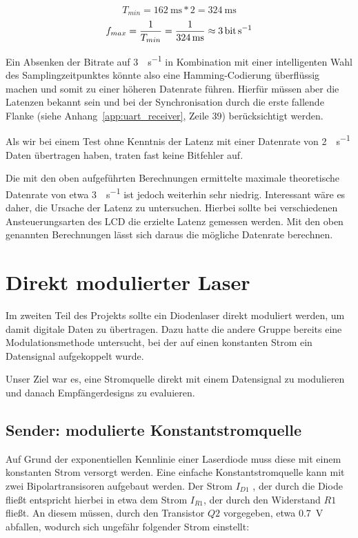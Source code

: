 \documentclass[12pt,a4paper]{article}
\begin{document}
\begin{equation}
	T_{min} = \SI{162}{\milli\second} * 2 = \SI{324}{\milli\second}
\end{equation}
\begin{equation}
	f_{max} = \frac{1}{T_{min}} = \frac{1}{\SI{324}{\milli\second}} \approx \SI{3}{\bit\per\second}
\end{equation}

Ein Absenken der Bitrate auf \SI{3}{\bit\per\second} in Kombination mit einer intelligenten Wahl des Samplingzeitpunktes könnte also eine Hamming-Codierung überflüssig machen und somit zu einer höheren Datenrate führen. Hierfür müssen aber die Latenzen bekannt sein und bei der Synchronisation durch die erste fallende Flanke (siehe Anhang~\ref{app:uart_receiver}, Zeile 39) berücksichtigt werden.

Als wir bei einem Test ohne Kenntnis der Latenz mit einer Datenrate von \SI{2}{\bit\per\second} Daten übertragen haben, traten fast keine Bitfehler auf.

Die mit den oben aufgeführten Berechnungen ermittelte maximale theoretische Datenrate von etwa \SI{3}{\bit\per\second} ist jedoch weiterhin sehr niedrig. Interessant wäre es daher, die Ursache der Latenz zu untersuchen. Hierbei sollte bei verschiedenen Ansteuerungsarten des LCD die erzielte Latenz gemessen werden. Mit den oben genannten Berechnungen lässt sich daraus die mögliche Datenrate berechnen.

\section{Direkt modulierter Laser}
Im zweiten Teil des Projekts sollte ein Diodenlaser direkt moduliert werden, um damit digitale Daten zu übertragen. Dazu hatte die andere Gruppe bereits eine Modulationsmethode untersucht, bei der auf einen konstanten Strom ein Datensignal aufgekoppelt wurde.

Unser Ziel war es, eine Stromquelle direkt mit einem Datensignal zu modulieren und danach Empfängerdesigns zu evaluieren.


\subsection{Sender: modulierte Konstantstromquelle}
\label{sec:direct_tx}
Auf Grund der exponentiellen Kennlinie einer Laserdiode muss diese mit einem konstanten Strom versorgt werden. Eine einfache Konstantstromquelle kann mit zwei Bipolartransisoren aufgebaut werden. Der Strom $I_{D1}$ , der durch die Diode fließt entspricht hierbei in etwa dem Strom $I_{R1}$, der durch den Widerstand $R1$ fließt. An diesem müssen, durch den Transistor  $Q2$ vorgegeben, etwa \SI{0.7}{\volt} abfallen, wodurch sich ungefähr folgender Strom einstellt:
\end{document}
